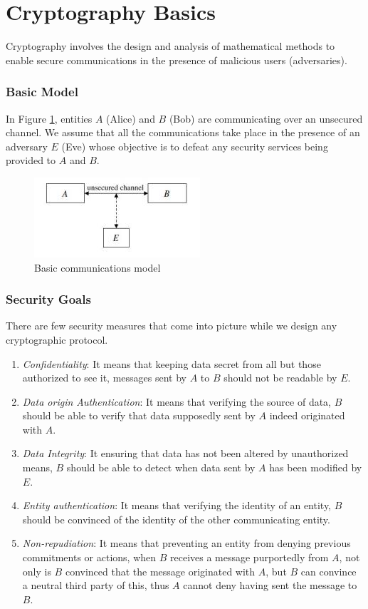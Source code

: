 \documentclass[a4paper,12pt]{report}
\begin{document}
\section{Cryptography Basics}
Cryptography involves the design and analysis of mathematical
methods to enable secure communications in the presence of malicious
users (adversaries).

\subsubsection{Basic Model}
In Figure \ref{HH}, entities $A$ (Alice) and $B$ (Bob) are
communicating over an unsecured channel. We assume that all the
communications take place in the presence of an adversary $E$ (Eve)
whose objective is to defeat any security services being provided to
$A$ and $B$.

\begin{figure}
\begin{center}
\includegraphics[scale=1.0]{./Basicmodelcomm}
\end{center}
\caption{Basic communications model}\label{HH}
\end{figure}

\subsubsection{Security Goals}
There are few security measures that come into picture while we
design any cryptographic protocol.
\begin{enumerate}
\item \textit{Confidentiality}: It means that keeping data secret from all but those authorized to see it,
messages sent by $A$ to $B$ should not be readable by $E$.

\item \textit{Data origin Authentication}: It means that verifying the source of data, $B$ should be able
to verify that data supposedly sent by $A$ indeed originated with $A$.

\item \textit{Data Integrity}: It ensuring that data has not been altered by unauthorized means, $B$ should
be able to detect when data sent by $A$ has been modified by $E$.

\item \textit{Entity authentication}: It means that verifying the identity of an entity, $B$ should be
convinced of the identity of the other communicating entity.

\item \textit{Non-repudiation}: It means that preventing an entity from denying previous commitments
or actions, when $B$ receives a message purportedly from $A$, not only is $B$ convinced that the
message originated with $A$, but $B$ can convince a neutral third party of this, thus $A$ cannot
deny having sent the message to $B$.
\end{enumerate}
\end{document}
